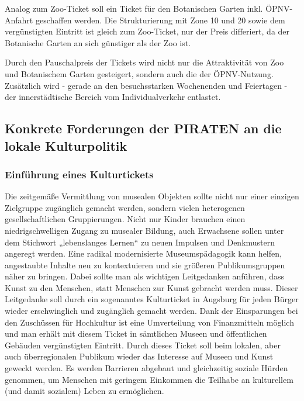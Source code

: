   Analog zum Zoo-Ticket soll ein Ticket für den Botanischen Garten inkl. 
  ÖPNV-Anfahrt geschaffen werden. Die Strukturierung mit Zone 10 und 20 sowie 
  dem vergünstigten Eintritt ist gleich zum Zoo-Ticket, nur der Preis 
  differiert, da der Botanische Garten an sich günstiger als der Zoo ist.
  
  Durch den Pauschalpreis der Tickets wird nicht nur die Attraktivität von Zoo 
  und Botanischem Garten gesteigert, sondern auch die der ÖPNV-Nutzung. 
  Zusätzlich wird - gerade an den besuchsstarken Wochenenden und Feiertagen - 
  der innerstädtische Bereich vom Individualverkehr entlastet.
  
  \subsection{Konkrete Forderungen der PIRATEN an die lokale Kulturpolitik}
  
  \subsubsection{Einführung eines Kulturtickets}
  
  Die zeitgemäße Vermittlung von musealen Objekten sollte nicht nur einer 
  einzigen Zielgruppe zugänglich gemacht werden, sondern vielen heterogenen 
  gesellschaftlichen Gruppierungen. Nicht nur Kinder brauchen einen 
  niedrigschwelligen Zugang zu musealer Bildung, auch Erwachsene sollen unter 
  dem Stichwort „lebenslanges Lernen“ zu neuen Impulsen und Denkmustern 
  angeregt werden. Eine radikal modernisierte Museumspädagogik kann helfen, 
  angestaubte Inhalte neu zu kontextuieren und sie größeren Publikumsgruppen 
  näher zu bringen. Dabei sollte man als wichtigen Leitgedanken anführen, 
  dass Kunst zu den Menschen, statt Menschen zur Kunst gebracht werden muss. 
  Dieser Leitgedanke soll durch ein sogenanntes Kulturticket in Augsburg für 
  jeden Bürger wieder erschwinglich und zugänglich gemacht werden. Dank der 
  Einsparungen bei den Zuschüssen für Hochkultur ist eine Umverteilung von 
  Finanzmitteln möglich und man erhält mit diesem Ticket in sämtlichen Museen 
  und öffentlichen Gebäuden vergünstigten Eintritt. Durch dieses Ticket soll 
  beim lokalen, aber auch überregionalen Publikum wieder das Interesse auf 
  Museen und Kunst geweckt werden. Es werden Barrieren abgebaut und 
  gleichzeitig soziale Hürden genommen, um Menschen mit geringem Einkommen 
  die Teilhabe an kulturellem (und damit sozialem) Leben zu ermöglichen.
  
